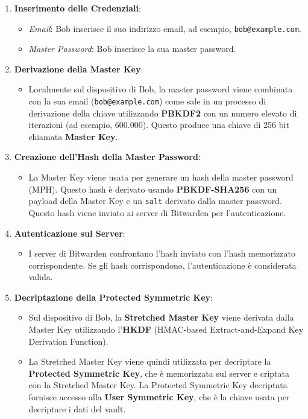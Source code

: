 \documentclass[a4paper,12pt]{report}
\begin{document}
				\begin{enumerate}
					\item \textbf{Inserimento delle Credenziali}:
					\begin{itemize}
						\item \textit{Email}: Bob inserisce il suo indirizzo email, ad esempio, \texttt{bob@example.com}.
						\item \textit{Master Password}: Bob inserisce la sua master password.
					\end{itemize}
					
					\item \textbf{Derivazione della Master Key}:
					\begin{itemize}
						\item Localmente sul dispositivo di Bob, la master password viene combinata con la sua email (\texttt{bob@example.com}) come sale in un processo di derivazione della chiave utilizzando \textbf{PBKDF2} con un numero elevato di iterazioni (ad esempio, 600.000). Questo produce una chiave di 256 bit chiamata \textbf{Master Key}.
					\end{itemize}

					\item \textbf{Creazione dell'Hash della Master Password}:
					\begin{itemize}
						\item La Master Key viene usata per generare un hash della master password (MPH). Questo hash è derivato usando \textbf{PBKDF-SHA256} con un payload della Master Key e un \texttt{salt} derivato dalla master password. Questo hash viene inviato ai server di Bitwarden per l'autenticazione.
					\end{itemize}

					\item \textbf{Autenticazione sul Server}:
					\begin{itemize}
						\item I server di Bitwarden confrontano l'hash inviato con l'hash memorizzato corrispondente. Se gli hash corrispondono, l'autenticazione è considerata valida.
					\end{itemize}

					\item \textbf{Decriptazione della Protected Symmetric Key}:
					\begin{itemize}
						\item Sul dispositivo di Bob, la \textbf{Stretched Master Key} viene derivata dalla Master Key utilizzando l'\textbf{HKDF} (HMAC-based Extract-and-Expand Key Derivation Function).
						\item La Stretched Master Key viene quindi utilizzata per decriptare la \textbf{Protected Symmetric Key}, che è memorizzata sul server e criptata con la Stretched Master Key. La Protected Symmetric Key decriptata fornisce accesso alla \textbf{User Symmetric Key}, che è la chiave usata per decriptare i dati del vault.
					\end{itemize}


\end{enumerate}
\end{document}
